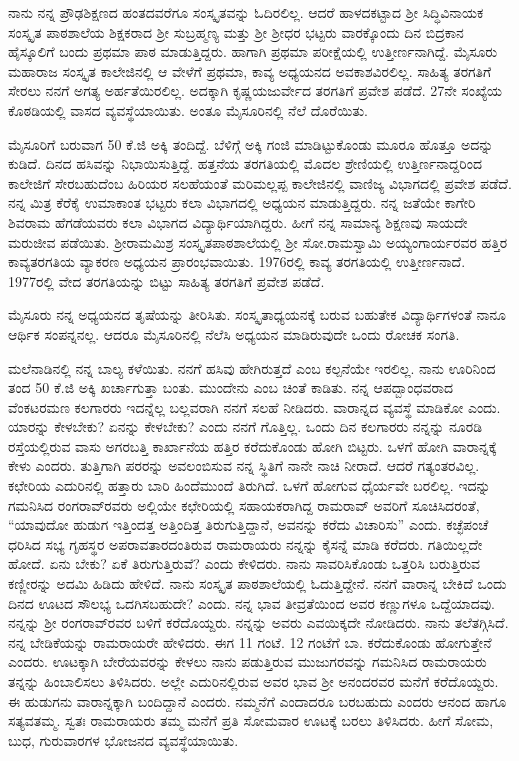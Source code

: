 {ನಾನು ನನ್ನ ಪ್ರೌಢಶಿಕ್ಷಣದ ಹಂತದವರೆಗೂ ಸಂಸ್ಕೃತವನ್ನು ಓದಿರಲಿಲ್ಲ.   ಆದರೆ ಹಾಳದಕಟ್ಟಾದ ಶ್ರೀ ಸಿದ್ಧಿವಿನಾಯಕ ಸಂಸ್ಕೃತ ಪಾಠಶಾಲೆಯ ಶಿಕ್ಷಕರಾದ ಶ್ರೀ ಸುಬ್ರಹ್ಮಣ್ಯ ಮತ್ತು ಶ್ರೀ ಶ್ರೀಧರ ಭಟ್ಟರು ವಾರಕ್ಕೊಂದು ದಿನ ಬಿದ್ರಕಾನ ಹೈಸ್ಕೂಲಿಗೆ ಬಂದು ಪ್ರಥಮಾ ಪಾಠ ಮಾಡುತ್ತಿದ್ದರು.  ಹಾಗಾಗಿ ಪ್ರಥಮಾ ಪರೀಕ್ಷೆಯಲ್ಲಿ ಉತ್ತೀರ್ಣನಾಗಿದ್ದೆ.  ಮೈಸೂರು ಮಹಾರಾಜ ಸಂಸ್ಕೃತ ಕಾಲೇಜಿನಲ್ಲಿ ಆ ವೇಳೆಗೆ ಪ್ರಥಮಾ, ಕಾವ್ಯ ಅಧ್ಯಯನದ ಅವಕಾಶವಿರಲಿಲ್ಲ.  ಸಾಹಿತ್ಯ ತರಗತಿಗೆ ಸೇರಲು ನನಗೆ ಅಗತ್ಯ ಅರ್ಹತೆಯಿರಲಿಲ್ಲ.  ಅದಕ್ಕಾಗಿ ಕೃಷ್ಣಯಜುರ್ವೇದ  ತರಗತಿಗೆ ಪ್ರವೇಶ ಪಡೆದೆ.  27ನೇ ಸಂಖ್ಯೆಯ ಕೊಠಡಿಯಲ್ಲಿ ವಾಸದ ವ್ಯವಸ್ಥೆಯಾಯಿತು. ಅಂತೂ ಮೈಸೂರಿನಲ್ಲಿ ನೆಲೆ ದೊರೆಯಿತು.

ಮೈಸೂರಿಗೆ ಬರುವಾಗ 50 ಕೆ.ಜಿ ಅಕ್ಕಿ ತಂದಿದ್ದೆ.  ಬೆಳಿಗ್ಗೆ ಅಕ್ಕಿ ಗಂಜಿ ಮಾಡಿಟ್ಟುಕೊಂಡು ಮೂರೂ ಹೊತ್ತೂ ಅದನ್ನು ಕುಡಿದೆ.  ದಿನದ ಹಸಿವನ್ನು ನಿಭಾಯಿಸುತ್ತಿದ್ದೆ.  ಹತ್ತನೆಯ ತರಗತಿಯಲ್ಲಿ ಮೊದಲ ಶ್ರೇಣಿಯಲ್ಲಿ ಉತ್ತಿರ್ಣನಾದ್ದರಿಂದ ಕಾಲೇಜಿಗೆ ಸೇರಬಹುದೆಂಬ ಹಿರಿಯರ ಸಲಹೆಯಂತೆ ಮರಿಮಲ್ಲಪ್ಪ ಕಾಲೇಜಿನಲ್ಲಿ ವಾಣಿಜ್ಯ ವಿಭಾಗದಲ್ಲಿ ಪ್ರವೇಶ ಪಡೆದೆ.  ನನ್ನ ಮಿತ್ರ ಕೆರೆಕೈ ಉಮಾಕಾಂತ ಭಟ್ಟರು ಕಲಾ ವಿಭಾಗದಲ್ಲಿ ಅಧ್ಯಯನ ಮಾಡುತ್ತಿದ್ದರು.  ನನ್ನ ಜತೆಯೇ ಕಾಗೇರಿ ಶಿವರಾಮ ಹೆಗಡೆಯವರು ಕಲಾ ವಿಭಾಗದ ವಿದ್ಯಾರ್ಥಿಯಾಗಿದ್ದರು.  ಹೀಗೆ ನನ್ನ ಸಾಮಾನ್ಯ ಶಿಕ್ಷಣವು ಸಾಯದೇ ಮರುಜೀವ ಪಡೆಯಿತು.  ಶ್ರೀರಾಮಮಿಶ್ರ ಸಂಸ್ಕೃತಪಾಠಶಾಲೆಯಲ್ಲಿ     ಶ್ರೀ ಸೋ.ರಾಮಸ್ವಾಮಿ ಅಯ್ಯಂಗಾರ್ಯರವರ ಹತ್ತಿರ ಕಾವ್ಯತರಗತಿಯ ವ್ಯಾಕರಣ ಅಧ್ಯಯನ ಪ್ರಾರಂಭವಾಯಿತು.  1976ರಲ್ಲಿ ಕಾವ್ಯ ತರಗತಿಯಲ್ಲಿ ಉತ್ತೀರ್ಣನಾದೆ.  1977ರಲ್ಲಿ ವೇದ ತರಗತಿಯನ್ನು ಬಿಟ್ಟು ಸಾಹಿತ್ಯ ತರಗತಿಗೆ ಪ್ರವೇಶ ಪಡೆದೆ.

ಮೈಸೂರು ನನ್ನ ಅಧ್ಯಯನದ ತೃಷೆಯನ್ನು ತೀರಿಸಿತು.  ಸಂಸ್ಕೃತಾಧ್ಯಯನಕ್ಕೆ ಬರುವ ಬಹುತೇಕ ವಿದ್ಯಾರ್ಥಿಗಳಂತೆ ನಾನೂ ಆರ್ಥಿಕ ಸಂಪನ್ನನಲ್ಲ.  ಆದರೂ ಮೈಸೂರಿನಲ್ಲಿ ನೆಲೆಸಿ ಅಧ್ಯಯನ ಮಾಡಿರುವುದೇ ಒಂದು ರೋಚಕ ಸಂಗತಿ. 

ಮಲೆನಾಡಿನಲ್ಲಿ ನನ್ನ ಬಾಲ್ಯ ಕಳೆಯಿತು.  ನನಗೆ ಹಸಿವು ಹೇಗಿರುತ್ತದೆ ಎಂಬ ಕಲ್ಪನೆಯೇ ಇರಲಿಲ್ಲ.  ನಾನು ಊರಿನಿಂದ  ತಂದ 50 ಕೆ.ಜಿ ಅಕ್ಕಿ ಖರ್ಚಾಗುತ್ತಾ ಬಂತು.  ಮುಂದೇನು ಎಂಬ ಚಿಂತೆ ಕಾಡಿತು.  ನನ್ನ ಆಪದ್ಬಾಂಧವರಾದ ವೆಂಕಟರಮಣ ಕಲಗಾರರು ಇದನ್ನೆಲ್ಲ ಬಲ್ಲವರಾಗಿ ನನಗೆ ಸಲಹೆ ನೀಡಿದರು.  ವಾರಾನ್ನದ ವ್ಯವಸ್ಥೆ ಮಾಡಿಕೋ ಎಂದು.  ಯಾರನ್ನು ಕೇಳಬೇಕು? ಏನನ್ನು ಕೇಳಬೇಕು? ಎಂದು ನನಗೆ ಗೊತ್ತಿಲ್ಲ.  ಒಂದು ದಿನ ಕಲಗಾರರು ನನ್ನನ್ನು ನೂರಡಿ ರಸ್ತೆಯಲ್ಲಿರುವ ವಾಸು ಅಗರಬತ್ತಿ ಕಾರ್ಖಾನೆಯ ಹತ್ತಿರ ಕರೆದುಕೊಂಡು ಹೋಗಿ ಬಿಟ್ಟರು.  ಒಳಗೆ ಹೋಗಿ ವಾರಾನ್ನಕ್ಕೆ ಕೇಳು ಎಂದರು.  ತುತ್ತಿಗಾಗಿ ಪರರನ್ನು ಅವಲಂಬಿಸುವ ನನ್ನ ಸ್ಥಿತಿಗೆ ನಾನೇ ನಾಚಿ ನೀರಾದೆ.  ಆದರೆ ಗತ್ಯಂತರವಿಲ್ಲ.  ಕಛೇರಿಯ ಎದುರಿನಲ್ಲಿ ಹತ್ತಾರು ಬಾರಿ ಹಿಂದೆಮುಂದೆ ತಿರುಗಿದೆ.  ಒಳಗೆ ಹೋಗುವ ಧೈರ್ಯವೇ ಬರಲಿಲ್ಲ.  ಇದನ್ನು ಗಮನಿಸಿದ ರಂಗರಾವ್‍ರವರು ಅಲ್ಲಿಯೇ ಕಛೇರಿಯಲ್ಲಿ ಸಹಾಯಕರಾಗಿದ್ದ ರಾಮರಾವ್ ಅವರಿಗೆ ಸೂಚಿಸಿದರಂತೆ,  “ಯಾವುದೋ ಹುಡುಗ ಇತ್ತಿಂದತ್ತ ಅತ್ತಿಂದಿತ್ತ  ತಿರುಗುತ್ತಿದ್ದಾನೆ, ಅವನನ್ನು ಕರೆದು ವಿಚಾರಿಸು” ಎಂದು.  ಕಚ್ಛೆಪಂಚೆ ಧರಿಸಿದ ಸಭ್ಯ ಗೃಹಸ್ಥರ ಅಪರಾವತಾರದಂತಿರುವ ರಾಮರಾಯರು ನನ್ನನ್ನು ಕೈಸನ್ನೆ ಮಾಡಿ ಕರೆದರು.  ಗತಿಯಿಲ್ಲದೇ ಹೋದೆ. ಏನು ಬೇಕು? ಏಕೆ ತಿರುಗುತ್ತಿರುವೆ? ಎಂದು ಕೇಳಿದರು.  ನಾನು ಸಾವರಿಸಿಕೊಂಡು ಒತ್ತರಿಸಿ ಬರುತ್ತಿರುವ ಕಣ್ಣೀರನ್ನು ಅದಮಿ ಹಿಡಿದು ಹೇಳಿದೆ.  ನಾನು ಸಂಸ್ಕೃತ ಪಾಠಶಾಲೆಯಲ್ಲಿ ಓದುತ್ತಿದ್ದೇನೆ. ನನಗೆ ವಾರಾನ್ನ ಬೇಕಿದೆ ಒಂದು ದಿನದ ಊಟದ ಸೌಲಭ್ಯ ಒದಗಿಸಬಹುದೇ? ಎಂದು.  ನನ್ನ ಭಾವ ತೀವ್ರತೆಯಿಂದ ಅವರ ಕಣ್ಣುಗಳೂ ಒದ್ದೆಯಾದವು.  ನನ್ನನ್ನು ಶ್ರೀ ರಂಗರಾವ್‍ರವರ ಬಳಿಗೆ ಕರೆದೊಯ್ದರು.  ನನ್ನನ್ನು ಅವರು ಎವಯಿಕ್ಕದೇ ನೋಡಿದರು.  ನಾನು ತಲೆತಗ್ಗಿಸಿದೆ.  ನನ್ನ ಬೇಡಿಕೆಯನ್ನು ರಾಮರಾಯರೇ ಹೇಳಿದರು.  ಈಗ 11 ಗಂಟೆ. 12 ಗಂಟೆಗೆ ಬಾ. ಕರೆದುಕೊಂಡು ಹೋಗುತ್ತೇನೆ ಎಂದರು.  ಊಟಕ್ಕಾಗಿ ಬೇರೆಯವರನ್ನು ಕೇಳಲು ನಾನು ಪಡುತ್ತಿರುವ ಮುಜುಗರವನ್ನು ಗಮನಿಸಿದ ರಾಮರಾಯರು ತನ್ನನ್ನು ಹಿಂಬಾಲಿಸಲು ತಿಳಿಸಿದರು.  ಅಲ್ಲೇ ಎದುರಿನಲ್ಲಿರುವ ಅವರ ಭಾವ ಶ್ರೀ ಅನಂದರವರ ಮನೆಗೆ ಕರೆದೊಯ್ದರು.  ಈ ಹುಡುಗನು ವಾರಾನ್ನಕ್ಕಾಗಿ ಬಂದಿದ್ದಾನೆ ಎಂದರು. ನಮ್ಮನೆಗೆ ಎಂದಾದರೂ ಬರಬಹುದು ಎಂದರು ಆನಂದ ಹಾಗೂ ಸತ್ಯವತಮ್ಮ. ಸ್ವತಃ ರಾಮರಾಯರು ತಮ್ಮ ಮನೆಗೆ ಪ್ರತಿ ಸೋಮವಾರ ಊಟಕ್ಕೆ ಬರಲು ತಿಳಿಸಿದರು.  ಹೀಗೆ ಸೋಮ, ಬುಧ, ಗುರುವಾರಗಳ ಭೋಜನದ ವ್ಯವಸ್ಥೆಯಾಯಿತು. 

}
